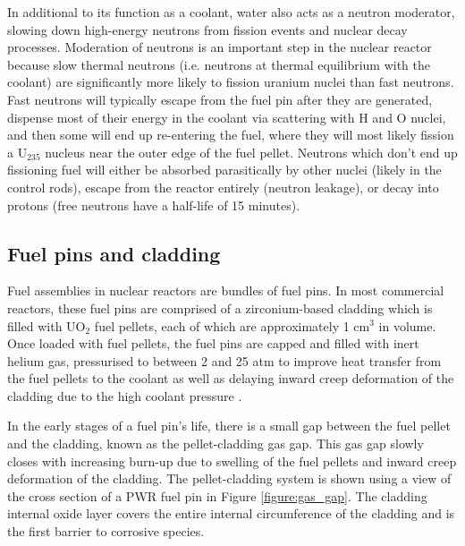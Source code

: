 In additional to its function as a coolant, water also acts as a neutron moderator, slowing down high-energy neutrons from fission events and nuclear decay processes. Moderation of neutrons is an important step in the nuclear reactor because slow thermal neutrons (i.e. neutrons at thermal equilibrium with the coolant) are significantly more likely to fission uranium nuclei than fast neutrons. Fast neutrons will typically escape from the fuel pin after they are generated, dispense most of their energy in the coolant via scattering with H and O nuclei, and then some will end up re-entering the fuel, where they will most likely fission a U$_{235}$ nucleus near the outer edge of the fuel pellet. Neutrons which don't end up fissioning fuel will either be absorbed parasitically by other nuclei (likely in the control rods), escape from the reactor entirely (neutron leakage), or decay into protons (free neutrons have a half-life of 15 minutes).


\subsection{Fuel pins and cladding} \label{ss_fuelpin}

Fuel assemblies in nuclear reactors are bundles of fuel pins. In most commercial reactors, these fuel pins are comprised of a zirconium-based cladding which is filled with UO$_{2}$ fuel pellets, each of which are approximately 1 cm$^{3}$ in volume. Once loaded with fuel pellets, the fuel pins are capped and filled with inert helium gas, pressurised to between 2 and 25 atm to improve heat transfer from the fuel pellets to the coolant as well as delaying inward creep deformation of the cladding due to the high coolant pressure \cite{King1980}. 

In the early stages of a fuel pin's life, there is a small gap between the fuel pellet and the cladding, known as the pellet-cladding gas gap. This gas gap slowly closes with increasing burn-up due to swelling of the fuel pellets and inward creep deformation of the cladding. The pellet-cladding system is shown using a view of the cross section of a PWR fuel pin in Figure \ref{figure:gas_gap}. The cladding internal oxide layer covers the entire internal circumference of the cladding and is the first barrier to corrosive species. 

